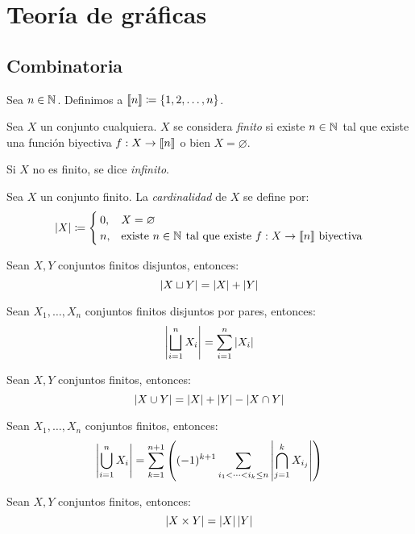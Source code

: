 \section{Teoría de gráficas}
\subsection{Combinatoria}
\begin{notation}
	Sea $n\in\mathbb{N}^{}$. Definimos a $\left\llbracket n \right\rrbracket\coloneqq\left\{ 1, 2,\dotsc, n \right\}$.
\end{notation}
\begin{definition}
	Sea $X$ un conjunto cualquiera. $X$ se considera \emph{finito} si existe $n\in\mathbb{N}^{}$ tal que existe una función biyectiva $f : X\to\left\llbracket n \right\rrbracket$ o bien $X =\varnothing$.\par 
	Si $X$ no es finito, se dice \emph{infinito}.
\end{definition}
\begin{definition}[Cardinalidad]
	Sea $X$ un conjunto finito. La \emph{cardinalidad} de $X$ se define por:
	\[ 
		\left\vert X \right\vert\coloneqq
		\begin{cases}
			0, & X =\varnothing\\
			n, & \text{existe $n\in\mathbb{N}^{}$ tal que existe $f : X\to\left\llbracket n \right\rrbracket$ biyectiva}
		\end{cases}
	\]
\end{definition}
\begin{theorem}
	Sean $X, Y$ conjuntos finitos disjuntos, entonces:
	\[ \left\vert X\sqcup Y \right\vert =\left\vert X \right\vert +\left\vert Y \right\vert \]
\end{theorem}
\begin{coll}
	Sean $X_{1},\dotsc, X_{n}$ conjuntos finitos disjuntos por pares, entonces:
	\[ \left\vert \bigsqcup_{i = 1}^{n}X_{i} \right\vert =\sum_{i = 1}^{n}\left\vert X_{i} \right\vert \]
\end{coll}
\begin{theorem}
	Sean $X, Y$ conjuntos finitos, entonces:
	\[ \left\vert X\cup Y \right\vert =\left\vert X \right\vert + \left\vert Y \right\vert -\left\vert X\cap Y \right\vert \]
\end{theorem}
\begin{coll}
	Sean $X_{1},\dotsc, X_{n}$ conjuntos finitos, entonces:
	\[ \left\vert \bigcup_{i = 1}^{n}X_{i} \right\vert =\sum_{k = 1}^{n + 1}\left( (-1)^{k + 1}\sum_{i_{1}<\dotsb<i_{k}\leq n}\left\vert \bigcap_{j = 1}^{k}X_{i_{j}} \right\vert \right) \]
\end{coll}
\begin{theorem}
	Sean $X, Y$ conjuntos finitos, entonces:
	\[ \left\vert X\times Y \right\vert =\left\vert X \right\vert\left\vert Y \right\vert \]
\end{theorem}
